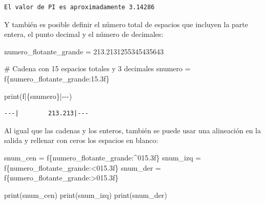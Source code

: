 \documentclass[
  spanish,
  letterpaper,
]{scrbook}
\newenvironment{Shaded}{\begin{snugshade}}{\end{snugshade}}
\newcommand{\BuiltInTok}[1]{\textcolor[rgb]{0.00,0.23,0.31}{#1}}
\newcommand{\CommentTok}[1]{\textcolor[rgb]{0.37,0.37,0.37}{#1}}
\newcommand{\FloatTok}[1]{\textcolor[rgb]{0.68,0.00,0.00}{#1}}
\newcommand{\NormalTok}[1]{\textcolor[rgb]{0.00,0.23,0.31}{#1}}
\newcommand{\OperatorTok}[1]{\textcolor[rgb]{0.37,0.37,0.37}{#1}}
\newcommand{\SpecialCharTok}[1]{\textcolor[rgb]{0.37,0.37,0.37}{#1}}
\newcommand{\SpecialStringTok}[1]{\textcolor[rgb]{0.13,0.47,0.30}{#1}}
\theoremstyle{definition}
\theoremstyle{remark}
\begin{document}
\begin{verbatim}
El valor de PI es aproximadamente 3.14286
\end{verbatim}

Y también es posible definir el número total de espacios que incluyen la
parte entera, el punto decimal y el número de decimales:

\begin{Shaded}
\begin{Highlighting}[]
\NormalTok{numero\_flotante\_grande }\OperatorTok{=} \FloatTok{213.2131255345435643}

\CommentTok{\# Cadena con 15 espacios totales y 3 decimales}
\NormalTok{snumero }\OperatorTok{=} \SpecialStringTok{f\textquotesingle{}}\SpecialCharTok{\{}\NormalTok{numero\_flotante\_grande}\SpecialCharTok{:15.3f\}}\SpecialStringTok{\textquotesingle{}}

\BuiltInTok{print}\NormalTok{(}\SpecialStringTok{f\textquotesingle{}{-}{-}{-}|}\SpecialCharTok{\{}\NormalTok{snumero}\SpecialCharTok{\}}\SpecialStringTok{|{-}{-}{-}\textquotesingle{}}\NormalTok{)}
\end{Highlighting}
\end{Shaded}

\begin{verbatim}
---|        213.213|---
\end{verbatim}

Al igual que las cadenas y los enteros, también se puede usar una
alineación en la salida y rellenar con ceros los espacios en blanco:

\begin{Shaded}
\begin{Highlighting}[]
\NormalTok{snum\_cen }\OperatorTok{=} \SpecialStringTok{f\textquotesingle{}}\SpecialCharTok{\{}\NormalTok{numero\_flotante\_grande}\SpecialCharTok{:\^{}015.3f\}}\SpecialStringTok{\textquotesingle{}}
\NormalTok{snum\_izq }\OperatorTok{=} \SpecialStringTok{f\textquotesingle{}}\SpecialCharTok{\{}\NormalTok{numero\_flotante\_grande}\SpecialCharTok{:\textless{}015.3f\}}\SpecialStringTok{\textquotesingle{}}
\NormalTok{snum\_der }\OperatorTok{=} \SpecialStringTok{f\textquotesingle{}}\SpecialCharTok{\{}\NormalTok{numero\_flotante\_grande}\SpecialCharTok{:\textgreater{}015.3f\}}\SpecialStringTok{\textquotesingle{}}

\BuiltInTok{print}\NormalTok{(snum\_cen)}
\BuiltInTok{print}\NormalTok{(snum\_izq)}
\BuiltInTok{print}\NormalTok{(snum\_der)}
\end{Highlighting}
\end{Shaded}
\end{document}
